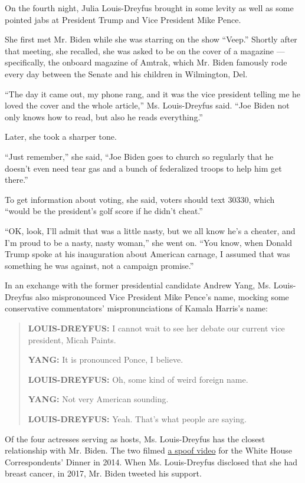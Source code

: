 On the fourth night, Julia Louis-Dreyfus brought in some levity as well
as some pointed jabs at President Trump and Vice President Mike Pence.

She first met Mr. Biden while she was starring on the show ``Veep.''
Shortly after that meeting, she recalled, she was asked to be on the
cover of a magazine --- specifically, the onboard magazine of Amtrak,
which Mr. Biden famously rode every day between the Senate and his
children in Wilmington, Del.

``The day it came out, my phone rang, and it was the vice president
telling me he loved the cover and the whole article,'' Ms. Louis-Dreyfus
said. ``Joe Biden not only knows how to read, but also he reads
everything.''

Later, she took a sharper tone.

``Just remember,'' she said, ``Joe Biden goes to church so regularly
that he doesn't even need tear gas and a bunch of federalized troops to
help him get there.''

To get information about voting, she said, voters should text 30330,
which ``would be the president's golf score if he didn't cheat.''

``OK, look, I'll admit that was a little nasty, but we all know he's a
cheater, and I'm proud to be a nasty, nasty woman,'' she went on. ``You
know, when Donald Trump spoke at his inauguration about American
carnage, I assumed that was something he was against, not a campaign
promise.''

In an exchange with the former presidential candidate Andrew Yang, Ms.
Louis-Dreyfus also mispronounced Vice President Mike Pence's name,
mocking some conservative commentators' mispronunciations of Kamala
Harris's name:

\begin{quote}
\textbf{LOUIS-DREYFUS:} I cannot wait to see her debate our current vice
president, Micah Paints.

\textbf{YANG:} It is pronounced Ponce, I believe.

\textbf{LOUIS-DREYFUS:} Oh, some kind of weird foreign name.

\textbf{YANG:} Not very American sounding.

\textbf{LOUIS-DREYFUS:} Yeah. That's what people are saying.
\end{quote}

Of the four actresses serving as hosts, Ms. Louis-Dreyfus has the
closest relationship with Mr. Biden. The two filmed
\href{https://www.youtube.com/watch?v=da5tjfpKyac}{a spoof video} for
the White House Correspondents' Dinner in 2014. When Ms. Louis-Dreyfus
disclosed that she had breast cancer, in 2017, Mr. Biden tweeted his
support.

